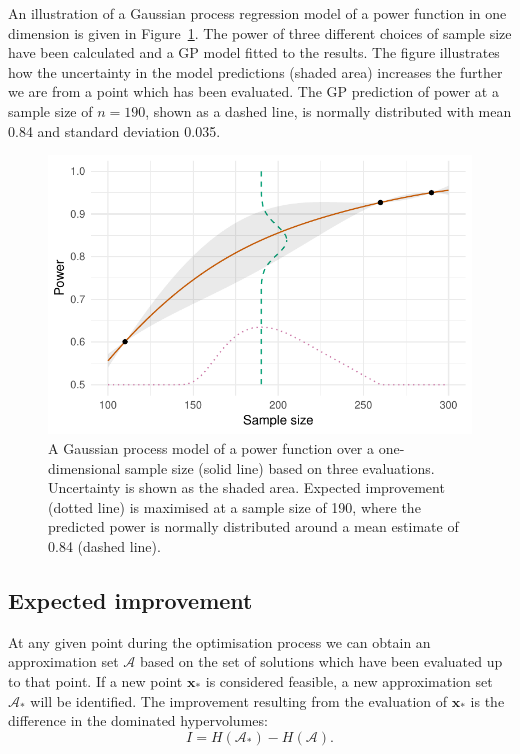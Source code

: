 \documentclass[]{sagej}
\begin{document}
An illustration of a Gaussian process regression model of a power function in one dimension is given in Figure~\ref{fig:GP_example}. The power of three different choices of sample size have been calculated and a GP model fitted to the results. The figure illustrates how the uncertainty in the model predictions (shaded area) increases the further we are from a point which has been evaluated. The GP prediction of power at a sample size of $n = 190$, shown as a dashed line, is normally distributed with mean 0.84 and standard deviation 0.035.

\begin{figure}
\centering
\includegraphics[scale=0.8]{./Figures/GP_example}
\caption{A Gaussian process model of a power function over a one-dimensional sample size (solid line) based on three evaluations. Uncertainty is shown as the shaded area. Expected improvement (dotted line) is maximised at a sample size of 190, where the predicted power is normally distributed around a mean estimate of 0.84 (dashed line).}
\label{fig:GP_example}
\end{figure}


\subsection{Expected improvement}\label{sec:EGO}

At any given point during the optimisation process we can obtain an approximation set $\mathcal{A}$ based on the set of solutions which have been evaluated up to that point. If a new point $\mathbf{x}_{*}$ is considered feasible, a new approximation set $\mathcal{A}_{*}$ will be identified. The improvement resulting from the evaluation of $\mathbf{x}_{*}$ is the difference in the dominated hypervolumes:
\begin{equation}
I = H(\mathcal{A}_{*}) - H(\mathcal{A}).
\end{equation}
\end{document}
